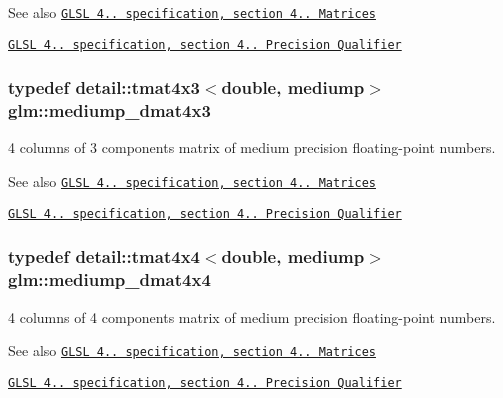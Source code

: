\begin{DoxySeeAlso}{See also}
\href{http://www.opengl.org/registry/doc/GLSLangSpec.4.20.8.pdf}{\tt G\+L\+SL 4.. specification, section 4.. Matrices} 

\href{http://www.opengl.org/registry/doc/GLSLangSpec.4.20.8.pdf}{\tt G\+L\+SL 4.. specification, section 4.. Precision Qualifier} 
\end{DoxySeeAlso}
\subsubsection[{\texorpdfstring{mediump\+\_\+dmat4x3}{mediump_dmat4x3}}]{\setlength{\rightskip}{0pt plus 5cm}typedef detail\+::tmat4x3$<$double, mediump$>$ {\bf glm\+::mediump\+\_\+dmat4x3}}\hypertarget{group__core__precision_gafa1ba33d2748737129cde471fedbf9c5}{}\label{group__core__precision_gafa1ba33d2748737129cde471fedbf9c5}
4 columns of 3 components matrix of medium precision floating-\/point numbers.

\begin{DoxySeeAlso}{See also}
\href{http://www.opengl.org/registry/doc/GLSLangSpec.4.20.8.pdf}{\tt G\+L\+SL 4.. specification, section 4.. Matrices} 

\href{http://www.opengl.org/registry/doc/GLSLangSpec.4.20.8.pdf}{\tt G\+L\+SL 4.. specification, section 4.. Precision Qualifier} 
\end{DoxySeeAlso}
\subsubsection[{\texorpdfstring{mediump\+\_\+dmat4x4}{mediump_dmat4x4}}]{\setlength{\rightskip}{0pt plus 5cm}typedef detail\+::tmat4x4$<$double, mediump$>$ {\bf glm\+::mediump\+\_\+dmat4x4}}\hypertarget{group__core__precision_gad64329d45b05417ccf0cc3c23f584d26}{}\label{group__core__precision_gad64329d45b05417ccf0cc3c23f584d26}
4 columns of 4 components matrix of medium precision floating-\/point numbers.

\begin{DoxySeeAlso}{See also}
\href{http://www.opengl.org/registry/doc/GLSLangSpec.4.20.8.pdf}{\tt G\+L\+SL 4.. specification, section 4.. Matrices} 

\href{http://www.opengl.org/registry/doc/GLSLangSpec.4.20.8.pdf}{\tt G\+L\+SL 4.. specification, section 4.. Precision Qualifier} 
\end{DoxySeeAlso}

